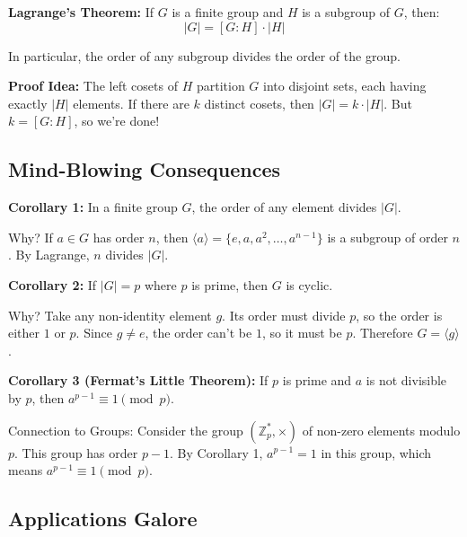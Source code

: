 \documentclass[12pt]{article}
\begin{document}
\begin{theorembox}
\textbf{Lagrange's Theorem:} If $G$ is a finite group and $H$ is a subgroup of $G$, then:
\[|G| = [G:H] \cdot |H|\]

In particular, the order of any subgroup divides the order of the group.
\end{theorembox}

\textbf{Proof Idea:} The left cosets of $H$ partition $G$ into disjoint sets, each having exactly $|H|$ elements. If there are $k$ distinct cosets, then $|G| = k \cdot |H|$. But $k = [G:H]$, so we're done! 

\subsection{\textcolor{HeaderColor}{Mind-Blowing Consequences}}

\begin{theorembox}
\textbf{Corollary 1:} In a finite group $G$, the order of any element divides $|G|$.
\end{theorembox}

Why? If $a \in G$ has order $n$, then $\langle a \rangle = \{e, a, a^2, \ldots, a^{n-1}\}$ is a subgroup of order $n$. By Lagrange, $n$ divides $|G|$.

\begin{theorembox}
\textbf{Corollary 2:} If $|G| = p$ where $p$ is prime, then $G$ is cyclic.
\end{theorembox}

Why? Take any non-identity element $g$. Its order must divide $p$, so the order is either $1$ or $p$. Since $g \neq e$, the order can't be $1$, so it must be $p$. Therefore $G = \langle g \rangle$.

\begin{theorembox}
\textbf{Corollary 3 (Fermat's Little Theorem):} If $p$ is prime and $a$ is not divisible by $p$, then $a^{p-1} \equiv 1 \pmod{p}$.
\end{theorembox}

Connection to Groups: Consider the group $(\mathbb{Z}_p^*, \times)$ of non-zero elements modulo $p$. This group has order $p-1$. By Corollary 1, $a^{p-1} = 1$ in this group, which means $a^{p-1} \equiv 1 \pmod{p}$.

\subsection{\textcolor{HeaderColor}{Applications Galore}}
\end{document}

